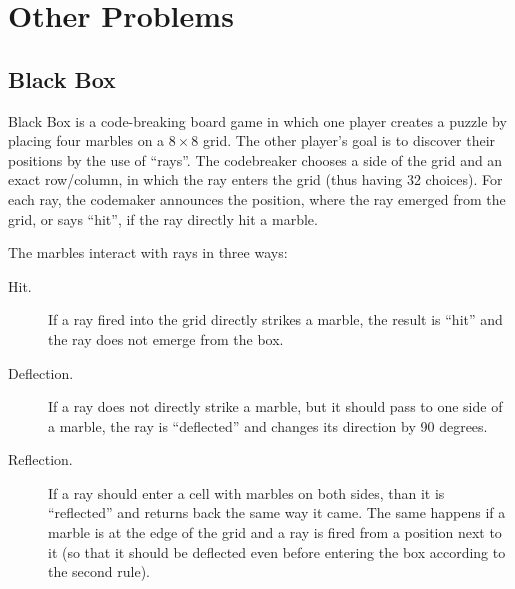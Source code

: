 \section{Other Problems}
\subsection{Black Box}

Black Box is a code-breaking board game in which one player creates a
  puzzle by placing four marbles on a $8\times 8$ grid.
The other player's goal is to discover their positions
  by the use of ``rays''.
The codebreaker chooses a side of the grid and an exact row/column, in which
  the ray enters the grid (thus having 32 choices).
For each ray, the codemaker announces the position, where the ray emerged from the grid,
  or says ``hit'', if the ray directly hit a marble\cite{blackbox}.

The marbles interact with rays in three ways:
\begin{description}
\item[Hit.] If a ray fired into the grid directly strikes a marble,
  the result is ``hit'' and the ray does not emerge from the box.
\item[Deflection.] If a ray does not directly strike a marble,
  but it should pass to one side of a marble, the ray is
  ``deflected'' and changes its direction by 90 degrees.
\item[Reflection.] If a ray should enter a cell with marbles on both sides,
  than it is ``reflected'' and returns back the same way it came.
  The same happens if a marble is at the edge of the grid
  and a ray is fired from a position next to it (so that it should be deflected
  even before entering the box according to the second rule).
\end{description}


